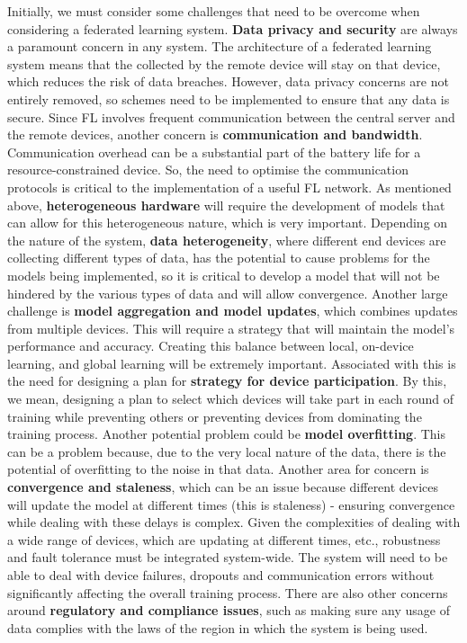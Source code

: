 \documentclass[conference]{IEEEtran}
\begin{document}
Initially, we must consider some challenges that need to be overcome when considering a federated learning system. \textbf{Data privacy and security} are always a paramount concern in any system. The architecture of a federated learning system means that the collected by the remote device will stay on that device, which reduces the risk of data breaches. However, data privacy concerns are not entirely removed, so schemes need to be implemented to ensure that any data is secure. Since FL involves frequent communication between the central server and the remote devices, another concern is \textbf{communication and bandwidth}. Communication overhead can be a substantial part of the battery life for a resource-constrained device. So, the need to optimise the communication protocols is critical to the implementation of a useful FL network. As mentioned above, \textbf{heterogeneous hardware} will require the development of models that can allow for this heterogeneous nature, which is very important. Depending on the nature of the system, \textbf{data heterogeneity}, where different end devices are collecting different types of data, has the potential to cause problems for the models being implemented, so it is critical to develop a model that will not be hindered by the various types of data and will allow convergence. Another large challenge is \textbf{model aggregation and model updates}, which combines updates from multiple devices. This will require a strategy that will maintain the model's performance and accuracy. Creating this balance between local, on-device learning, and global learning will be extremely important. Associated with this is the need for designing a plan for \textbf{strategy for device participation}. By this, we mean, designing a plan to select which devices will take part in each round of training while preventing others or preventing devices from dominating the training process. Another potential problem could be \textbf{model overfitting}. This can be a problem because, due to the very local nature of the data, there is the potential of overfitting to the noise in that data. Another area for concern is \textbf{convergence and staleness}, which can be an issue because different devices will update the model at different times (this is staleness) - ensuring convergence while dealing with these delays is complex. Given the complexities of dealing with a wide range of devices, which are updating at different times, etc., robustness and fault tolerance must be integrated system-wide. The system will need to be able to deal with device failures, dropouts and communication errors without significantly affecting the overall training process. There are also other concerns around \textbf{regulatory and compliance issues}, such as making sure any usage of data complies with the laws of the region in which the system is being used.
\end{document}
